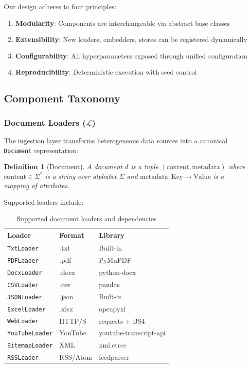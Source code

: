 \documentclass[11pt,a4paper]{article}
\newtheorem{definition}{Definition}
\begin{document}
Our design adheres to four principles:

\begin{enumerate}
    \item \textbf{Modularity}: Components are interchangeable via abstract base classes
    \item \textbf{Extensibility}: New loaders, embedders, stores can be registered dynamically
    \item \textbf{Configurability}: All hyperparameters exposed through unified configuration
    \item \textbf{Reproducibility}: Deterministic execution with seed control
\end{enumerate}

\subsection{Component Taxonomy}

\subsubsection{Document Loaders ($\mathcal{L}$)}

The ingestion layer transforms heterogeneous data sources into a canonical \texttt{Document} representation:

\begin{definition}[Document]
A document $d$ is a tuple $(\text{content}, \text{metadata})$ where $\text{content} \in \Sigma^*$ is a string over alphabet $\Sigma$ and $\text{metadata} : \text{Key} \rightarrow \text{Value}$ is a mapping of attributes.
\end{definition}

Supported loaders include:

\begin{table}[h]
\centering
\small
\begin{tabular}{lll}
\toprule
\textbf{Loader} & \textbf{Format} & \textbf{Library} \\
\midrule
\texttt{TxtLoader} & .txt & Built-in \\
\texttt{PDFLoader} & .pdf & PyMuPDF \\
\texttt{DocxLoader} & .docx & python-docx \\
\texttt{CSVLoader} & .csv & pandas \\
\texttt{JSONLoader} & .json & Built-in \\
\texttt{ExcelLoader} & .xlsx & openpyxl \\
\texttt{WebLoader} & HTTP/S & requests + BS4 \\
\texttt{YouTubeLoader} & YouTube & youtube-transcript-api \\
\texttt{SitemapLoader} & XML & xml.etree \\
\texttt{RSSLoader} & RSS/Atom & feedparser \\
\bottomrule
\end{tabular}
\caption{Supported document loaders and dependencies}
\label{tab:loaders}
\end{table}
\end{document}
